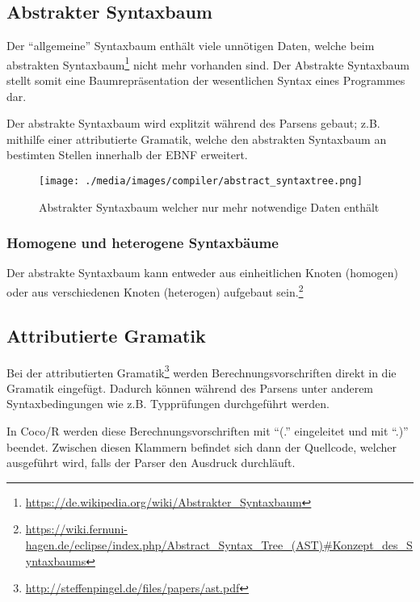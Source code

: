 \subsection{Abstrakter Syntaxbaum}

Der ``allgemeine'' Syntaxbaum enth\"alt viele unn\"otigen Daten, welche beim abstrakten Syntaxbaum\footnote{\url{https://de.wikipedia.org/wiki/Abstrakter_Syntaxbaum}} nicht mehr vorhanden sind. Der Abstrakte Syntaxbaum stellt somit eine Baumrepr\"asentation der wesentlichen Syntax eines Programmes dar.

Der abstrakte Syntaxbaum wird explitzit w\"ahrend des Parsens gebaut; z.B. mithilfe einer attributierte Gramatik, welche den abstrakten Syntaxbaum an bestimten Stellen innerhalb der EBNF erweitert.

\begin{figure}[h]
\centering
\texttt{[image: ./media/images/compiler/abstract\_syntaxtree.png]}
\caption{Abstrakter Syntaxbaum welcher nur mehr notwendige Daten enth\"alt}
\label{compiler_parser_syntaxtree}
\end{figure}

\subsubsection{Homogene und heterogene Syntaxbäume}

Der abstrakte Syntaxbaum kann entweder aus einheitlichen Knoten (homogen) oder aus verschiedenen Knoten (heterogen) aufgebaut sein.\footnote{\url{https://wiki.fernuni-hagen.de/eclipse/index.php/Abstract_Syntax_Tree_(AST)\#Konzept_des_Syntaxbaums}}

\subsection{Attributierte Gramatik}

Bei der attributierten Gramatik\footnote{\url{http://steffenpingel.de/files/papers/ast.pdf}} werden Berechnungsvorschriften direkt in die Gramatik eingef\"ugt. Dadurch k\"onnen w\"ahrend des Parsens unter anderem Syntaxbedingungen wie z.B. Typpr\"ufungen durchgef\"uhrt werden.

In Coco/R werden diese Berechnungsvorschriften mit ``(.'' eingeleitet und mit ``.)'' beendet. Zwischen diesen Klammern befindet sich dann der Quellcode, welcher ausgef\"uhrt wird, falls der Parser den Ausdruck durchl\"auft.

